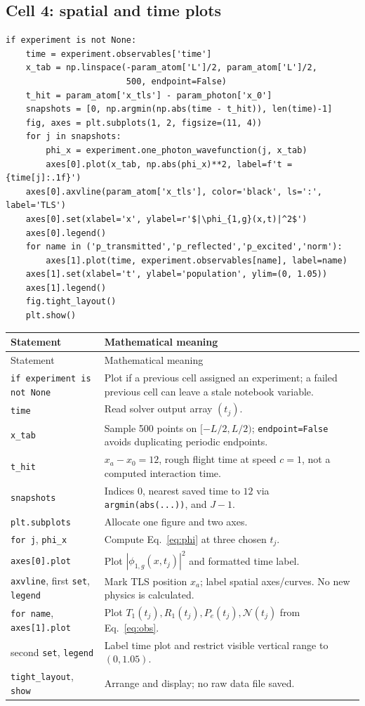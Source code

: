 \documentclass[11pt,a4paper]{article}
\newcommand{\code}[1]{\nolinkurl{#1}}
\begin{document}
\subsection{Cell 4: spatial and time plots}
\begin{lstlisting}
if experiment is not None:
    time = experiment.observables['time']
    x_tab = np.linspace(-param_atom['L']/2, param_atom['L']/2,
                        500, endpoint=False)
    t_hit = param_atom['x_tls'] - param_photon['x_0']
    snapshots = [0, np.argmin(np.abs(time - t_hit)), len(time)-1]
    fig, axes = plt.subplots(1, 2, figsize=(11, 4))
    for j in snapshots:
        phi_x = experiment.one_photon_wavefunction(j, x_tab)
        axes[0].plot(x_tab, np.abs(phi_x)**2, label=f't = {time[j]:.1f}')
    axes[0].axvline(param_atom['x_tls'], color='black', ls=':', label='TLS')
    axes[0].set(xlabel='x', ylabel=r'$|\phi_{1,g}(x,t)|^2$')
    axes[0].legend()
    for name in ('p_transmitted','p_reflected','p_excited','norm'):
        axes[1].plot(time, experiment.observables[name], label=name)
    axes[1].set(xlabel='t', ylabel='population', ylim=(0, 1.05))
    axes[1].legend()
    fig.tight_layout()
    plt.show()
\end{lstlisting}
\begin{longtable}{p{}p{}}
\toprule Statement & Mathematical meaning\\\midrule\endfirsthead
\toprule Statement & Mathematical meaning\\\midrule\endhead
\code{if experiment is not None} & Plot if a previous cell assigned an experiment; a failed previous cell can leave a stale notebook variable.\\
\code{time} & Read solver output array $(t_j)$.\\
\code{x_tab} & Sample 500 points on $[-L/2,L/2)$; \code{endpoint=False} avoids duplicating periodic endpoints.\\
\code{t_hit} & $x_a-x_0=12$, rough flight time at speed $c=1$, not a computed interaction time.\\
\code{snapshots} & Indices $0$, nearest saved time to $12$ via \code{argmin(abs(...))}, and $J-1$.\\
\code{plt.subplots} & Allocate one figure and two axes.\\
\code{for j}, \code{phi_x} & Compute Eq.~\eqref{eq:phi} at three chosen $t_j$.\\
\code{axes[0].plot} & Plot $|\phi_{1,g}(x,t_j)|^2$ and formatted time label.\\
\code{axvline}, first \code{set}, \code{legend} & Mark TLS position $x_a$; label spatial axes/curves. No new physics is calculated.\\
\code{for name}, \code{axes[1].plot} & Plot $T_1(t_j),R_1(t_j),P_e(t_j),\mathcal N(t_j)$ from Eq.~\eqref{eq:obs}.\\
second \code{set}, \code{legend} & Label time plot and restrict visible vertical range to $(0,1.05)$.\\
\code{tight_layout}, \code{show} & Arrange and display; no raw data file saved.\\
\bottomrule
\end{longtable}
\end{document}
